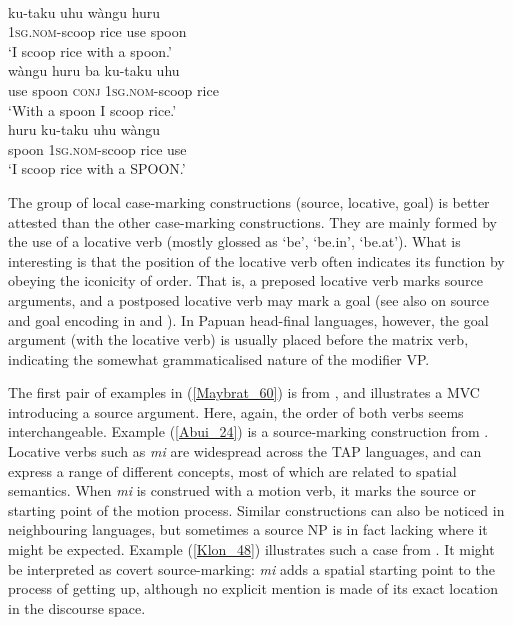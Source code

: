 \ea 
{}\\
\ea \label{Kambera_22a}
\gll ku-taku uhu wàngu huru \\
1\textsc{sg}.\textsc{nom}-scoop rice use spoon \\
\glft `I scoop rice with a spoon.' \\ 
\ex \label{Kambera_22b}
\gll wàngu huru ba ku-taku uhu \\
use spoon \textsc{conj} 1\textsc{sg}.\textsc{nom}-scoop rice \\
\glft `With a spoon I scoop rice.' \\ 
\ex \label{Kambera_22c}
\gll huru ku-taku uhu wàngu \\ 
spoon 1\textsc{sg}.\textsc{nom}-scoop rice use \\
\glft `I scoop rice with a SPOON.'\\ 
\z
\z

The group of local case-marking constructions (source, locative, goal) is better attested than the other case-marking constructions. They are mainly formed by the use of a locative verb (mostly glossed as `be', `be.in', `be.at'). What is interesting is that the position of the locative verb often indicates its function by obeying the iconicity of order. That is, a preposed locative verb marks source arguments, and a postposed locative verb may mark a goal (see also \citealt{schapper2011iconicity} on source and goal encoding in  and ). In Papuan head-final languages, however, the goal argument (with the locative verb) is usually placed before the matrix verb, indicating the somewhat grammaticalised nature of the modifier VP.

\largerpage[-1]
The first pair of examples in (\ref{Maybrat_60}) is from , and illustrates a MVC introducing a source argument. Here, again, the order of both verbs seems interchangeable. Example (\ref{Abui_24}) is a source-marking construction from . Locative verbs such as \textit{mi} are widespread across the TAP languages, and can express a range of different concepts, most of which are related to spatial semantics. When  \textit{mi} is construed with a motion verb, it marks the source or starting point of the motion process. Similar constructions can also be noticed in neighbouring languages, but sometimes a source NP is in fact lacking where it might be expected. Example (\ref{Klon_48}) illustrates such a case from . It might be interpreted as covert source-marking: \textit{mi} adds a spatial starting point to the process of getting up, although no explicit mention is made of its exact location in the discourse space.

